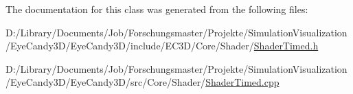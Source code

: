 The documentation for this class was generated from the following files\+:\begin{DoxyCompactItemize}
\item 
D\+:/\+Library/\+Documents/\+Job/\+Forschungsmaster/\+Projekte/\+Simulation\+Visualization/\+Eye\+Candy3\+D/\+Eye\+Candy3\+D/include/\+E\+C3\+D/\+Core/\+Shader/\mbox{\hyperlink{_shader_timed_8h}{Shader\+Timed.\+h}}\item 
D\+:/\+Library/\+Documents/\+Job/\+Forschungsmaster/\+Projekte/\+Simulation\+Visualization/\+Eye\+Candy3\+D/\+Eye\+Candy3\+D/src/\+Core/\+Shader/\mbox{\hyperlink{_shader_timed_8cpp}{Shader\+Timed.\+cpp}}\end{DoxyCompactItemize}
